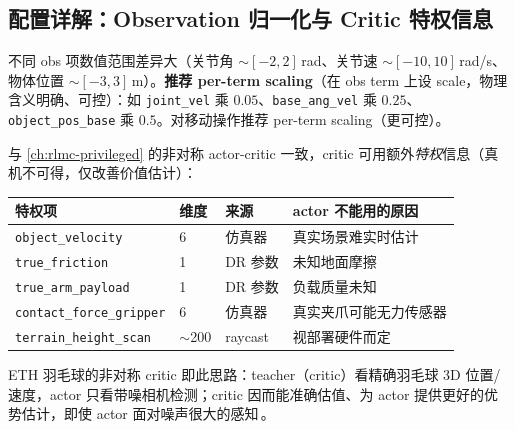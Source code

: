 \subsection{配置详解：Observation 归一化与 Critic 特权信息}
\label{sec:rlmc-lm-obs-norm}

不同 obs 项数值范围差异大（关节角 $\sim[-2,2]\,$rad、关节速 $\sim[-10,10]\,$rad/s、物体位置 $\sim[-3,3]\,$m）。\textbf{推荐 per-term scaling}（在 obs term 上设 scale，物理含义明确、可控）：如 \verb|joint_vel| 乘 $0.05$、\verb|base_ang_vel| 乘 $0.25$、\verb|object_pos_base| 乘 $0.5$。对移动操作推荐 per-term scaling（更可控）。

与 \cref{ch:rlmc-privileged} 的非对称 actor-critic 一致，critic 可用额外\emph{特权}信息（真机不可得，仅改善价值估计）：

\begin{center}
\small
\begin{tabular}{@{}llll@{}}
\toprule
特权项 & 维度 & 来源 & actor 不能用的原因 \\
\midrule
\texttt{object\_velocity} & 6 & 仿真器 & 真实场景难实时估计 \\
\texttt{true\_friction} & 1 & DR 参数 & 未知地面摩擦 \\
\texttt{true\_arm\_payload} & 1 & DR 参数 & 负载质量未知 \\
\texttt{contact\_force\_gripper} & 6 & 仿真器 & 真实夹爪可能无力传感器 \\
\texttt{terrain\_height\_scan} & $\sim$200 & raycast & 视部署硬件而定 \\
\bottomrule
\end{tabular}
\end{center}

ETH 羽毛球的非对称 critic 即此思路：teacher（critic）看精确羽毛球 3D 位置/速度，actor 只看带噪相机检测；critic 因而能准确估值、为 actor 提供更好的优势估计，即使 actor 面对噪声很大的感知\,\cite{ma2025badminton}。

